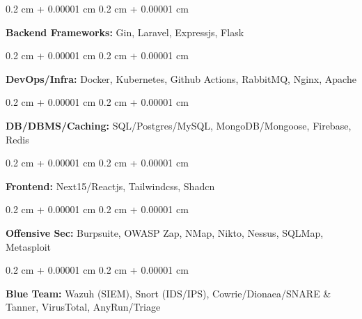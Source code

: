 \documentclass[10pt, letterpaper]{article}
\newenvironment{onecolentry}{
    \begin{adjustwidth}{
        0.2 cm + 0.00001 cm
    }{
        0.2 cm + 0.00001 cm
    }
}{
    \end{adjustwidth}
} %
\begin{document}
        \vspace{0.2 cm}

        \begin{onecolentry}
            \textbf{Backend Frameworks:} Gin, Laravel, Expressjs, Flask
        \end{onecolentry}

        \vspace{0.2 cm}

        \begin{onecolentry}
            \textbf{DevOps/Infra:} Docker, Kubernetes, Github Actions, RabbitMQ, Nginx, Apache
        \end{onecolentry}

        \vspace{0.2 cm}

        \begin{onecolentry}
            \textbf{DB/DBMS/Caching:} SQL/Postgres/MySQL, MongoDB/Mongoose, Firebase, Redis
        \end{onecolentry}

        \vspace{0.2 cm}

        \begin{onecolentry}
            \textbf{Frontend:} Next15/Reactjs, Tailwindcss, Shadcn
        \end{onecolentry}
    
        \vspace{0.2 cm}

        \begin{onecolentry}
            \textbf{Offensive Sec:} Burpsuite, OWASP Zap, NMap, Nikto, Nessus, SQLMap, Metasploit
        \end{onecolentry}

        \vspace{0.2 cm}

        \begin{onecolentry}
            \textbf{Blue Team:} Wazuh (SIEM), Snort (IDS/IPS), Cowrie/Dionaea/SNARE \& Tanner, VirusTotal, AnyRun/Triage
        \end{onecolentry}
\end{document}
